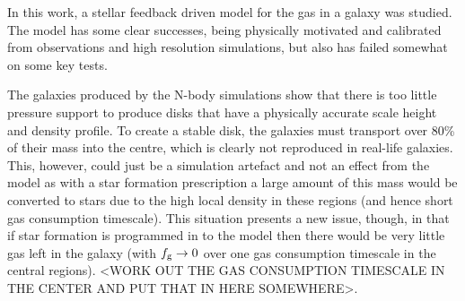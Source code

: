 In this work, a stellar feedback driven model for the gas in a galaxy was studied.
The model has some clear successes, being physically motivated and calibrated from observations and high resolution simulations, but also has failed somewhat on some key tests.

The galaxies produced by the N-body simulations show that there is too little pressure support to produce disks that have a physically accurate scale height and density profile.
To create a stable disk, the galaxies must transport over 80\% of their mass into the centre, which is clearly not reproduced in real-life galaxies.
This, however, could just be a simulation artefact and not an effect from the model as with a star formation prescription a large amount of this mass would be converted to stars due to the high local density in these regions (and hence short gas consumption timescale).
This situation presents a new issue, though, in that if star formation is programmed in to the model then there would be very little gas left in the galaxy (with $f_\mathrm{g} \rightarrow 0$ over one gas consumption timescale in the central regions). <WORK OUT THE GAS CONSUMPTION TIMESCALE IN THE CENTER AND PUT THAT IN HERE SOMEWHERE>.

